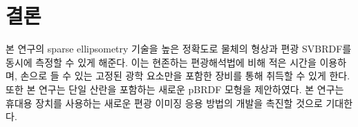 \documentclass[a4paper,twocolumn]{article}
\begin{document}
\section{결론}
\label{sec:conclusion}

본 연구의 sparse ellipsometry 기술을 높은 정확도로 물체의 형상과 편광 SVBRDF를 동시에 측정할 수 있게 해준다. 이는 현존하는 편광해석법에 비해 적은 시간을 이용하며, 손으로 들 수 있는 고정된 광학 요소만을 포함한 장비를 통해 취득할 수 있게 한다. 또한 본 연구는 단일 산란을 포함하는 새로운 pBRDF 모형을 제안하였다. 본 연구는 휴대용 장치를 사용하는 새로운  편광 이미징 응용 방법의 개발을 촉진할 것으로 기대한다. 

%



\nocite{*}


\end{document}
